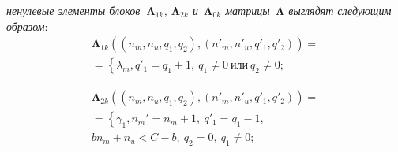 \begin{multicols}{2}
    \noindent
    \textit{ненулевые элементы блоков $~\mathbf{\Lambda}_{1k}$, 
    $\mathbf{\Lambda}_{2k}$ и~$\mathbf{\Lambda} _{0k}$ мат\-ри\-цы~$\mathbf{\Lambda} $ выглядят 
    следующим образом}:
\begin{multline*}
    \mathbf\Lambda_{1k}\left(
     (n_{m},n_{u},q_1,q_2), (n'_{m},n'_{u},q'_1,q'_2)
    \right)={}\\
    {}=\left\{
 \lambda_{m},
 q'_1=q_1+1,\ q_1\neq 0~\mbox{или}\ q_2\neq 0;
 \right.
 \end{multline*}
    
 
 \noindent
 \begin{multline*}
 \mathbf\Lambda_{2k}\left(
  (n_{m},n_{u},q_1,q_2),
  (n'_{m},n'_{u},q'_1,q'_2)
 \right)={}\\
 {}=\left\{
 \gamma_1,
 n_{m}'=n_{m}+1,~q'_1=q_1-1, \right.\\
 bn_{m}+n_{u}<C-b,~q_2=0,~q_1\neq0;
 \end{multline*}
    
    \vspace*{-12pt}


\end{multicols}

